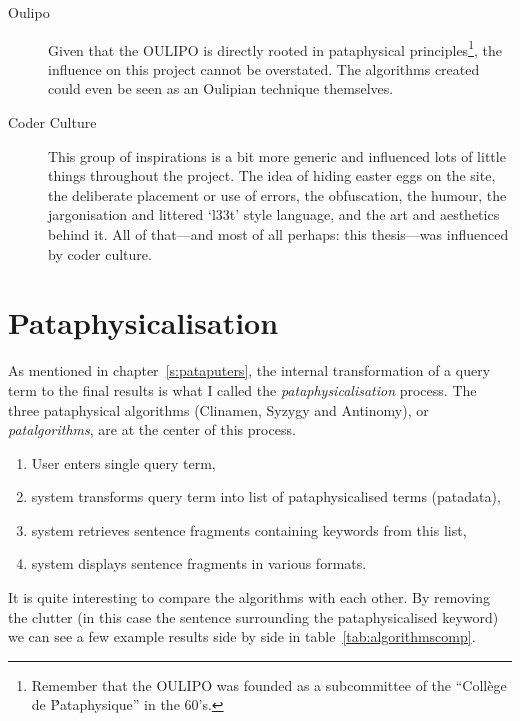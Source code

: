 \begin{description}
  \item[Oulipo] Given that the \ac{OULIPO} is directly rooted in pataphysical principles\footnote{Remember that the \ac{OULIPO} was founded as a subcommittee of the ``Coll\`{e}ge de \'Pataphysique'' in the 60's.}, the influence on this project cannot be overstated. The algorithms created could even be seen as an Oulipian technique themselves.
  \item[Coder Culture] This group of inspirations is a bit more generic and influenced lots of little things throughout the project. The idea of hiding easter eggs on the site, the deliberate placement or use of errors, the obfuscation, the humour, the jargonisation and littered `l33t' style language, and the art and aesthetics behind it. All of that---and most of all perhaps: this thesis---was influenced by coder culture.
\end{description}


\section{Pataphysicalisation}

As mentioned in chapter~\ref{s:pataputers}, the internal transformation of a query term to the final results is what I called the \emph{pataphysicalisation} process. The three pataphysical algorithms (Clinamen, Syzygy and Antinomy), or \emph{patalgorithms}, are at the center of this process. 

\begin{enumerate}
  \item User enters single query term,
  \item system transforms query term into list of pataphysicalised terms (patadata),
  \item system retrieves sentence fragments containing keywords from this list,
  \item system displays sentence fragments in various formats.
\end{enumerate}

It is quite interesting to compare the algorithms with each other. By removing the clutter (in this case the sentence surrounding the pataphysicalised keyword) we can see a few example results side by side in table~\ref{tab:algorithmscomp}.

